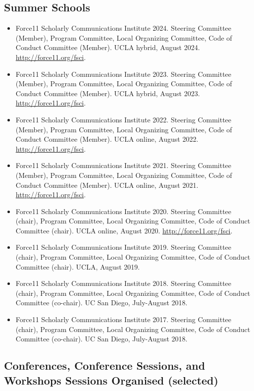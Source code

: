 \documentclass[12pt]{article}
\begin{document}
\subsection*{Summer Schools}
\begin{itemize}
  \item Force11 Scholarly Communications Institute 2024. Steering Committee (Member), Program Committee, Local Organizing Committee, Code of Conduct Committee (Member). UCLA hybrid, August 2024. \url{http://force11.org/fsci}.
  \item Force11 Scholarly Communications Institute 2023. Steering Committee (Member), Program Committee, Local Organizing Committee, Code of Conduct Committee (Member). UCLA hybrid, August 2023. \url{http://force11.org/fsci}.
  \item Force11 Scholarly Communications Institute 2022. Steering Committee (Member), Program Committee, Local Organizing Committee, Code of Conduct Committee (Member). UCLA online, August 2022. \url{http://force11.org/fsci}.
  \item Force11 Scholarly Communications Institute 2021. Steering Committee (Member), Program Committee, Local Organizing Committee, Code of Conduct Committee (Member). UCLA online, August 2021. \url{http://force11.org/fsci}.
  \item Force11 Scholarly Communications Institute 2020. Steering Committee (chair), Program Committee, Local Organizing Committee, Code of Conduct Committee (chair). UCLA online, August 2020. \url{http://force11.org/fsci}.
  \item Force11 Scholarly Communications Institute 2019. Steering Committee (chair), Program Committee, Local Organizing Committee, Code of Conduct Committee (chair). UCLA, August 2019.
  \item Force11 Scholarly Communications Institute 2018. Steering Committee (chair), Program Committee, Local Organizing Committee, Code of Conduct Committee (co-chair). UC San Diego, July-August 2018.
  \item Force11 Scholarly Communications Institute 2017. Steering Committee (chair), Program Committee, Local Organizing Committee, Code of Conduct Committee (co-chair). UC San Diego, July-August 2018.
\end{itemize}


\subsection*{Conferences, Conference Sessions, and Workshops Sessions Organised (selected)}
\end{document}
